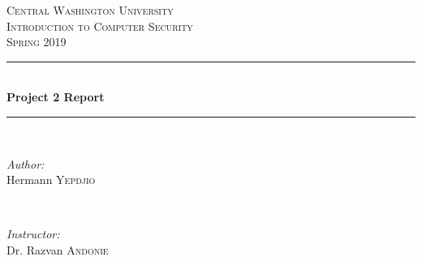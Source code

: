 \documentclass[12pt]{article}
\begin{document}
	
	\begin{titlepage}
		
		\newcommand{\HRule}{\rule{\linewidth}{0.5mm}} %
		
		\center %
		
		
		\textsc{\LARGE Central Washington University}\\[1.5cm] %
		\textsc{\Large Introduction to Computer Security}\\[0.5cm] %
		\textsc{\large Spring 2019}\\[0.5cm] %
		
		
		\HRule \\[0.4cm]
		{ \huge \bfseries Project 2 Report}\\[0.4cm] %
		\HRule \\[1.5cm]
		
		
		\begin{minipage}{0.4\textwidth}
			\begin{flushleft} \large
				\emph{Author:}\\
				Hermann \textsc{Yepdjio} %
			\end{flushleft}
		\end{minipage}
		~
		\begin{minipage}{0.4\textwidth}
			\begin{flushright} \large
				\emph{Instructor:} \\
				Dr. Razvan \textsc{Andonie} %
			\end{flushright}
		\end{minipage}\\[1cm]
		

\end{titlepage}
\end{document}
